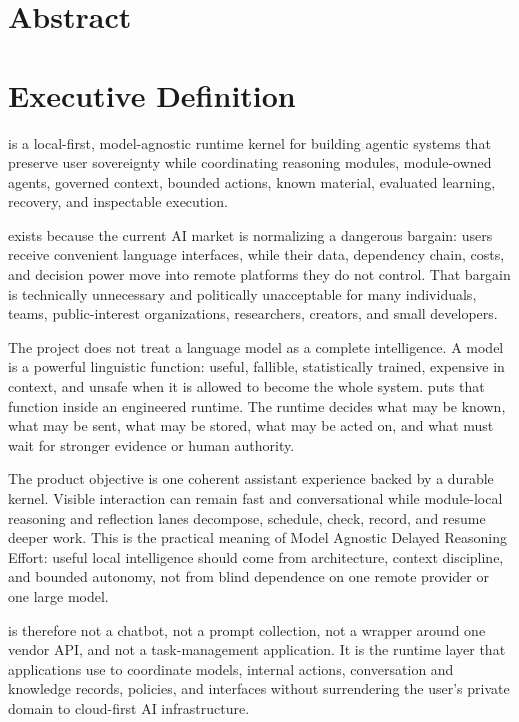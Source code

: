 

\section*{Abstract}
\section{Executive Definition}

\begin{pxQuote}
	\MADRE is a local-first, model-agnostic runtime kernel for building agentic systems that preserve user sovereignty while coordinating reasoning modules, module-owned agents, governed context, bounded actions, known material, evaluated learning, recovery, and inspectable execution.
\end{pxQuote}
\madreLogoH*[21em] exists because the current AI market is normalizing a dangerous bargain: users receive convenient language interfaces, while their data, dependency chain, costs, and decision power move into remote platforms they do not control. That bargain is technically unnecessary and politically unacceptable for many individuals, teams, public-interest organizations, researchers, creators, and small developers.\n

The project does not treat a language model as a complete intelligence. A model is a powerful linguistic function: useful, fallible, statistically trained, expensive in context, and unsafe when it is allowed to become the whole system. \Madre puts that function inside an engineered runtime. The runtime decides what may be known, what may be sent, what may be stored, what may be acted on, and what must wait for stronger evidence or human authority.

The product objective is one coherent assistant experience backed by a durable kernel. Visible interaction can remain fast and conversational while module-local reasoning and reflection lanes decompose, schedule, check, record, and resume deeper work. This is the practical meaning of Model Agnostic Delayed Reasoning Effort: useful local intelligence should come from architecture, context discipline, and bounded autonomy, not from blind dependence on one remote provider or one large model.\n

\Madre is therefore not a chatbot, not a prompt collection, not a wrapper around one vendor API, and not a task-management application. It is the runtime layer that applications use to coordinate models, internal actions, conversation and knowledge records, policies, and interfaces without surrendering the user's private domain to cloud-first AI infrastructure.

